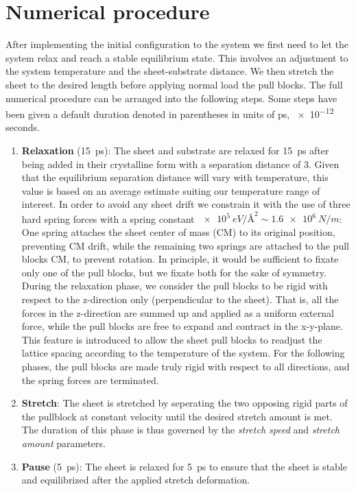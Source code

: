 \section{Numerical procedure}
After implementing the initial configuration to the system we first need to let the system relax and reach a stable equilibrium state. This involves an adjustment to the system temperature and the sheet-substrate distance. We then stretch the sheet to the desired length before applying normal load the pull blocks. The full numerical procedure can be arranged into the following steps. Some steps have been given a default duration denoted in parentheses in units of ps, \num{e-12} seconds.
\begin{enumerate}
  \item \textbf{Relaxation} (\SI{15}{ps}): The sheet and substrate are relaxed for 
  \SI{15}{ps} after being added in their crystalline form with a separation distance of \SI{3}{}. Given that the equilibrium separation distance will vary with temperature, this value is based on an average estimate suiting our temperature range of interest. In order to avoid any sheet drift we constrain it with the use of three hard spring forces with a spring constant
  $\SI{e5}{eV/\text{Å}^2} \sim \SI{1.6e6}{N/m}$: One spring attaches the sheet center of mass (\acrshort{CM}) to its original position, preventing \acrshort{CM} drift, while the remaining two springs are attached to the pull blocks \acrshort{CM}, to prevent rotation. In principle, it would be sufficient to fixate only one of the pull blocks, but we fixate both for the sake of symmetry. During the relaxation phase, we consider the pull blocks to be rigid with respect to the z-direction only (perpendicular to the sheet). That is, all the forces in the z-direction are summed up and applied as a uniform external force, while the pull blocks are free to expand and contract in the x-y-plane. This feature is introduced to allow the sheet pull blocks to readjust the lattice spacing according to the temperature of the system. For the following phases, the pull blocks are made truly rigid with respect to all directions, and the spring forces are terminated. 
  \item \textbf{Stretch}: The sheet is stretched by seperating the two opposing rigid parts of the pullblock at constant velocity until the desired stretch amount is met. The duration of this phase is thus governed by the  \textit{stretch speed} and \textit{stretch amount} parameters. 
  \item \textbf{Pause} (\SI{5}{ps}): The sheet is relaxed for \SI{5}{ps} to ensure that the sheet is stable and equilibrized after the applied stretch deformation. 

\end{enumerate}
